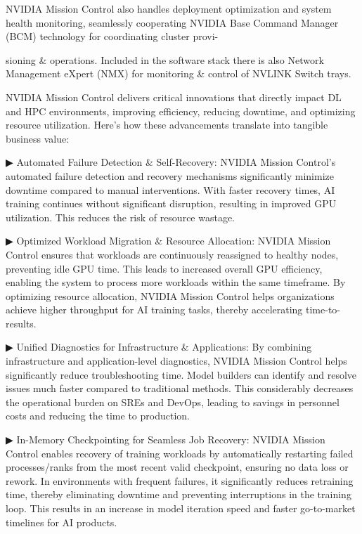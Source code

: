 \documentclass[
  10
]{article}
\begin{document}
NVIDIA Mission Control also handles deployment optimization and system
health monitoring, seamlessly cooperating NVIDIA Base Command Manager
(BCM) technology for coordinating cluster provi-

sioning \& operations. Included in the software stack there is also
Network Management eXpert (NMX) for monitoring \& control of NVLINK
Switch trays.

NVIDIA Mission Control delivers critical innovations that directly
impact DL and HPC environments, improving efficiency, reducing downtime,
and optimizing resource utilization. Here's how these advancements
translate into tangible business value:

▶ Automated Failure Detection \& Self-Recovery: NVIDIA Mission Control's
automated failure detection and recovery mechanisms significantly
minimize downtime compared to manual interventions. With faster recovery
times, AI training continues without significant disruption, resulting
in improved GPU utilization. This reduces the risk of resource wastage.

▶ Optimized Workload Migration \& Resource Allocation: NVIDIA Mission
Control ensures that workloads are continuously reassigned to healthy
nodes, preventing idle GPU time. This leads to increased overall GPU
efficiency, enabling the system to process more workloads within the
same timeframe. By optimizing resource allocation, NVIDIA Mission
Control helps organizations achieve higher throughput for AI training
tasks, thereby accelerating time-to-results.

▶ Unified Diagnostics for Infrastructure \& Applications: By combining
infrastructure and application-level diagnostics, NVIDIA Mission Control
helps significantly reduce troubleshooting time. Model builders can
identify and resolve issues much faster compared to traditional methods.
This considerably decreases the operational burden on SREs and DevOps,
leading to savings in personnel costs and reducing the time to
production.

▶ In-Memory Checkpointing for Seamless Job Recovery: NVIDIA Mission
Control enables recovery of training workloads by automatically
restarting failed processes/ranks from the most recent valid checkpoint,
ensuring no data loss or rework. In environments with frequent failures,
it significantly reduces retraining time, thereby eliminating downtime
and preventing interruptions in the training loop. This results in an
increase in model iteration speed and faster go-to-market timelines for
AI products.
\end{document}
